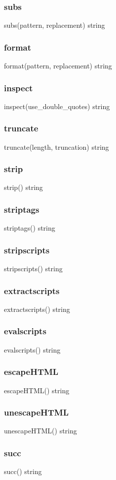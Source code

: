 {{\subsubsection*{subs}
subs(pattern, replacement) \rightarrow string
\subsubsection*{format}
format(pattern, replacement) \rightarrow string
\subsubsection*{inspect} 
inspect(use_double_quotes) \rightarrow string
\subsubsection*{truncate}
truncate(length, truncation) \rightarrow string
\subsubsection*{strip}
strip() \rightarrow string
\subsubsection*{striptags}
striptags() \rightarrow string
\subsubsection*{stripscripts}
stripscripts() \rightarrow string
\subsubsection*{extractscripts}
extractscripts() \rightarrow string
\subsubsection*{evalscripts}
evalscripts() \rightarrow string
\subsubsection*{escapeHTML}
escapeHTML() \rightarrow string
\subsubsection*{unescapeHTML}
unescapeHTML() \rightarrow string
\subsubsection*{succ}
succ() \rightarrow string
}}
